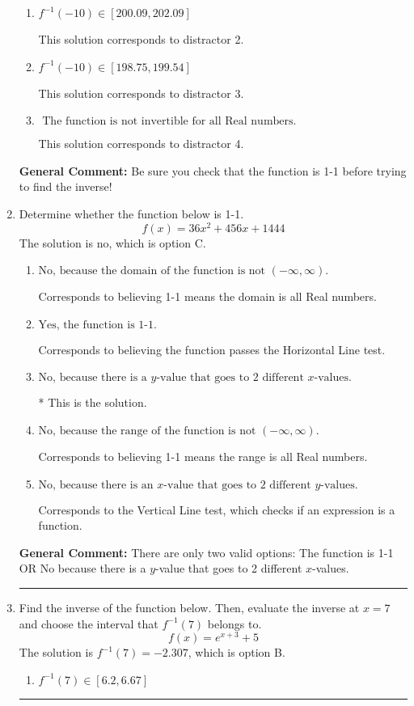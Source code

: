 \documentclass{extbook}[14pt]
\newcommand{\litem}[1]{\item #1

\rule{\textwidth}{0.4pt}}
\begin{document}
\begin{enumerate}
{\begin{enumerate}[label=\Alph*.]
* This is the correct solution.
\item \( f^{-1}(-10) \in [200.09, 202.09] \)

 This solution corresponds to distractor 2.
\item \( f^{-1}(-10) \in [198.75, 199.54] \)

 This solution corresponds to distractor 3.
\item \( \text{ The function is not invertible for all Real numbers. } \)

 This solution corresponds to distractor 4.
\end{enumerate}

\textbf{General Comment:} Be sure you check that the function is 1-1 before trying to find the inverse!
}
\litem{
Determine whether the function below is 1-1.
\[ f(x) = 36 x^2 + 456 x + 1444 \]The solution is \( \text{no} \), which is option C.\begin{enumerate}[label=\Alph*.]
\item \( \text{No, because the domain of the function is not $(-\infty, \infty)$.} \)

Corresponds to believing 1-1 means the domain is all Real numbers.
\item \( \text{Yes, the function is 1-1.} \)

Corresponds to believing the function passes the Horizontal Line test.
\item \( \text{No, because there is a $y$-value that goes to 2 different $x$-values.} \)

* This is the solution.
\item \( \text{No, because the range of the function is not $(-\infty, \infty)$.} \)

Corresponds to believing 1-1 means the range is all Real numbers.
\item \( \text{No, because there is an $x$-value that goes to 2 different $y$-values.} \)

Corresponds to the Vertical Line test, which checks if an expression is a function.
\end{enumerate}

\textbf{General Comment:} There are only two valid options: The function is 1-1 OR No because there is a $y$-value that goes to 2 different $x$-values.
}
\litem{
Find the inverse of the function below. Then, evaluate the inverse at $x = 7$ and choose the interval that $f^{-1}(7)$ belongs to.
\[ f(x) = e^{x+3}+5 \]The solution is \( f^{-1}(7) = -2.307 \), which is option B.\begin{enumerate}[label=\Alph*.]
\item \( f^{-1}(7) \in [6.2, 6.67] \)


\end{enumerate}}
\end{enumerate}
\end{document}
